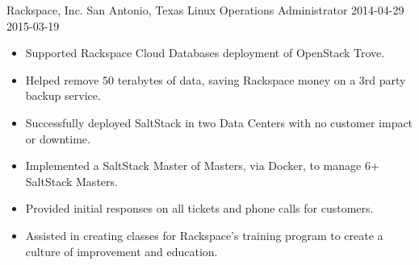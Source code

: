 \roleheader
    {Rackspace, Inc.}
    {San Antonio, Texas}
    {Linux Operations Administrator }
    {2014-04-29}
    {2015-03-19}

\begin{itemize}
    \item Supported Rackspace Cloud Databases deployment of OpenStack Trove.
    \item Helped remove 50 terabytes of data, saving Rackspace money on a 3rd party backup service.
    \item Successfully deployed SaltStack in two Data Centers with no customer impact or downtime.
    \item Implemented a SaltStack Master of Masters, via Docker, to manage 6+ SaltStack Masters.
    \item Provided initial responses on all tickets and phone calls for customers.
    \item Assisted in creating classes for Rackspace’s training program to create a culture of improvement and education.
\end{itemize}